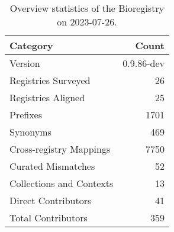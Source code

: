 \begin{table}
\caption{Overview statistics of the Bioregistry on 2023-07-26.}
\label{tab:bioregistry-summary}
\begin{tabular}{lr}
\toprule
Category & Count \\
\midrule
Version & 0.9.86-dev \\
Registries Surveyed & 26 \\
Registries Aligned & 25 \\
Prefixes & 1701 \\
Synonyms & 469 \\
Cross-registry Mappings & 7750 \\
Curated Mismatches & 52 \\
Collections and Contexts & 13 \\
Direct Contributors & 41 \\
Total Contributors & 359 \\
\bottomrule
\end{tabular}
\end{table}
